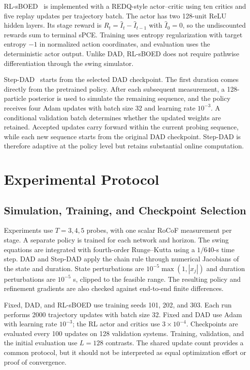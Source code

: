 \documentclass[conference,letterpaper]{IEEEtran}
\begin{document}
RL-sBOED~\cite{blau2022rlsboed} is implemented with a REDQ-style actor--critic using ten critics and five replay updates per trajectory batch. The actor has two 128-unit ReLU hidden layers. Its stage reward is $R_t=\widehat I_t-\widehat I_{t-1}$ with $\widehat I_0=0$, so the undiscounted rewards sum to terminal sPCE. Training uses entropy regularization with target entropy $-1$ in normalized action coordinates, and evaluation uses the deterministic actor output. Unlike DAD, RL-sBOED does not require pathwise differentiation through the swing simulator.

Step-DAD~\cite{hedman2025stepdad} starts from the selected DAD checkpoint. The first duration comes directly from the pretrained policy. After each subsequent measurement, a 128-particle posterior is used to simulate the remaining sequence, and the policy receives four Adam updates with batch size 32 and learning rate $10^{-3}$. A conditional validation batch determines whether the updated weights are retained. Accepted updates carry forward within the current probing sequence, while each new sequence starts from the original DAD checkpoint. Step-DAD is therefore adaptive at the policy level but retains substantial online computation.

\section{Experimental Protocol}\label{sec:protocol}
\subsection{Simulation, Training, and Checkpoint Selection}
Experiments use $T=3,4,5$ probes, with one scalar RoCoF measurement per stage. A separate policy is trained for each network and horizon. The swing equations are integrated with fourth-order Runge--Kutta using a $1/640$-s time step. DAD and Step-DAD apply the chain rule through numerical Jacobians of the state and duration. State perturbations are $10^{-5}\max(1,|x_j|)$ and duration perturbations are $10^{-5}$ s, clipped to the feasible range. The resulting policy and refinement gradients are also checked against end-to-end finite differences.

Fixed, DAD, and RL-sBOED use training seeds 101, 202, and 303. Each run performs 2000 trajectory updates with batch size 32. Fixed and DAD use Adam with learning rate $10^{-3}$; the RL actor and critics use $3\times10^{-4}$. Checkpoints are evaluated every 100 updates on 128 validation systems. Training, validation, and the initial evaluation use $L=128$ contrasts. The shared update count provides a common protocol, but it should not be interpreted as equal optimization effort or proof of convergence.
\end{document}
